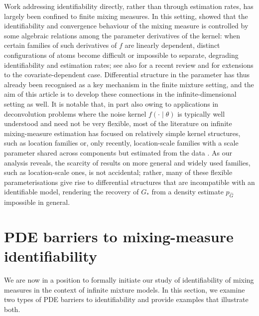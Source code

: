 \documentclass[11pt,twoside]{article} %
\begin{document}
Work addressing identifiability directly, rather than through estimation rates,
has largely been confined to finite mixing measures. In this setting,
\cite{Ho-Nguyen-Ann-16,Ho-Nguyen-EJS-16,manole2022refined} showed that the
identifiability and convergence behaviour of the mixing measure is controlled by some algebraic
relations among the parameter derivatives of the kernel: when certain families
of such derivatives of $f$ are linearly dependent, distinct configurations
of atoms become difficult or impossible to separate, degrading identifiability
and estimation rates; see also \cite{nguyen2026optimal} for a recent review and
\cite{ho2022convergence,nguyen2023demystifying,do2025strong,bariletto2026bayesian} for
extensions to the covariate-dependent case. Differential structure in the
parameter has thus already been recognised as a key mechanism in the finite
mixture setting, and the aim of this article is to develop these connections in
the infinite-dimensional setting as well. It is notable that, in part also owing to applications in deconvolution
problems \citep{Caillerie-etal-11,dedecker2013minimax,dedecker2015improved}
where the noise kernel $f(\cdot\mid\theta)$ is typically well understood and need not be very flexible, most of
the literature on infinite mixing-measure estimation has focused on relatively
simple kernel structures, such as location families or, only recently,
location-scale families with a scale parameter shared across components but estimated from the data
\citep{bariletto2026convergence}. As our analysis reveals, the scarcity of results
on more general and widely used families, such as location-scale ones, is not accidental; rather, many of these flexible parameterisations give rise to differential structures that are
incompatible with an identifiable model, rendering the recovery of $G_*$ from a
density estimate $p_{\hat G}$ impossible in general.


\section{PDE barriers to mixing-measure identifiability}\label{sec:pde_barriers}

We are now in a position to formally initiate our study of identifiability of mixing measures in the context of infinite mixture models. In this section, we examine two types of PDE barriers to identifiability and provide examples that illustrate both.
\end{document}
